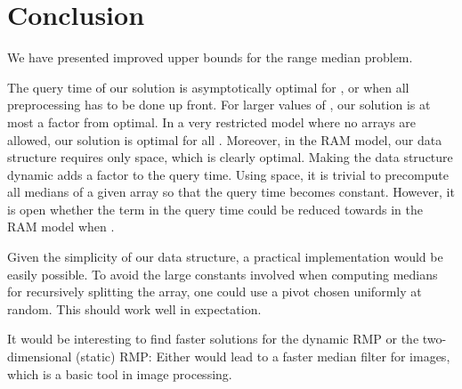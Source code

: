 \documentclass[a4paper,10pt]{article}
\begin{document}
\section{Conclusion}\label{s:conclusions}



We have presented improved upper bounds for the range median problem. 

The query time of  our solution is asymptotically optimal for , or when all preprocessing has to be done up front.
For larger values of , our solution is at most a factor  from optimal. In a very restricted model where no arrays are allowed, our solution is optimal for all . Moreover, in the RAM model, our data structure requires only  space, which is clearly optimal. Making the data structure dynamic adds a factor   to the query time.
Using  space, it is trivial to precompute all medians of a given array so that the query time
becomes constant. However, it is open whether the term  in the query time could be reduced towards  in the RAM model when .

Given the simplicity of our data structure, a practical implementation would be easily possible.
To avoid the large constants involved when computing medians for recursively splitting the array,
one could use a pivot chosen uniformly at random. This should work  well in expectation.

It would be interesting to find faster solutions for the dynamic RMP or the two-dimensional (static) RMP:
Either would lead to a faster median filter for images, which is a basic tool in image processing.





\end{document}
